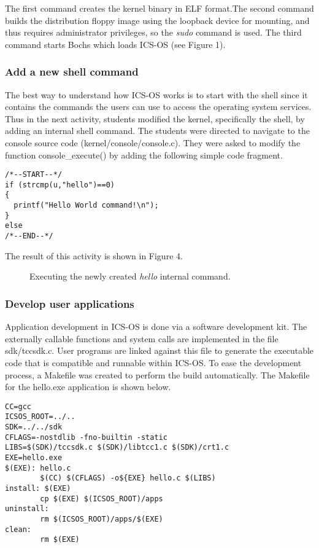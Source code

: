 \documentclass{acm_proc_article-sp}
\begin{document}
The first command creates the kernel binary in ELF format.The second command 
builds the distribution floppy image using the loopback device for mounting,
and thus requires administrator privileges, so the \textit{sudo} command is used.
The third command starts Bochs\cite{bochs:site} which loads ICS-OS (see 
Figure 1).

\subsubsection{Add a new shell command}
The best way to understand how ICS-OS works is to start with the shell since 
it contains the commands the users can use to access the operating system 
services. Thus in the next activity, students modified the kernel,
specifically the shell, by adding an internal shell command. The students were
directed to navigate to the console source code (kernel/console/console.c). 
They were asked to modify the function console\_execute() by adding the 
following simple code fragment.

\begin{verbatim}
/*--START--*/
if (strcmp(u,"hello")==0)
{
  printf("Hello World command!\n");
}
else
/*--END--*/
\end{verbatim}

The result of this activity is shown in Figure 4.

\begin{figure}
\centering
{}
\caption{Executing the newly created \textit{hello} internal command.}
\end{figure}


\subsubsection{Develop user applications}
Application development in ICS-OS is done via a software development kit.
The externally callable functions and system calls are implemented in the file 
sdk/tccsdk.c. User programs are linked against this file to generate the
executable code that is compatible and runnable within ICS-OS. To ease the 
development process, a Makefile was created to perform the build
automatically. The Makefile for the hello.exe application is shown below.

\begin{verbatim}
CC=gcc
ICSOS_ROOT=../..
SDK=../../sdk
CFLAGS=-nostdlib -fno-builtin -static
LIBS=$(SDK)/tccsdk.c $(SDK)/libtcc1.c $(SDK)/crt1.c
EXE=hello.exe
$(EXE): hello.c
        $(CC) $(CFLAGS) -o${EXE} hello.c $(LIBS)
install: $(EXE)
        cp $(EXE) $(ICSOS_ROOT)/apps
uninstall:
        rm $(ICSOS_ROOT)/apps/$(EXE)
clean:
        rm $(EXE)
\end{verbatim}
\end{document}

